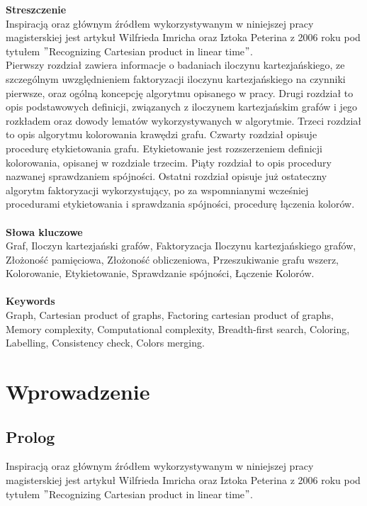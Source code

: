 \documentclass[12pt,a4paper,titlepage]{article}
\begin{document}
\textbf{Streszczenie}\\

Inspiracją oraz głównym źródłem wykorzystywanym w niniejszej pracy magisterskiej jest artykuł Wilfrieda Imricha oraz Iztoka Peterina z 2006 roku pod tytułem $"$Recognizing Cartesian product in linear time$"$. \\
Pierwszy rozdział zawiera informacje o badaniach iloczynu kartezjańskiego, ze szczególnym uwzględnieniem faktoryzacji iloczynu kartezjańskiego na czynniki pierwsze, oraz ogólną koncepcję algorytmu opisanego w pracy. Drugi rozdział to opis podstawowych definicji, związanych z iloczynem kartezjańskim grafów i jego rozkładem oraz dowody lematów wykorzystywanych w algorytmie. Trzeci rozdział to opis algorytmu kolorowania krawędzi grafu. Czwarty rozdział opisuje procedurę etykietowania grafu. Etykietowanie jest rozszerzeniem definicji kolorowania, opisanej w rozdziale trzecim. Piąty rozdział to opis procedury nazwanej sprawdzaniem spójności. Ostatni rozdział opisuje już ostateczny algorytm faktoryzacji wykorzystujący, po za wspomnianymi wcześniej procedurami etykietowania i sprawdzania spójności, procedurę łączenia kolorów. \\
\\
\textbf{Słowa kluczowe}\\

Graf, Iloczyn kartezjański grafów, Faktoryzacja Iloczynu kartezjańskiego grafów, Złożoność pamięciowa, Złożoność obliczeniowa, Przeszukiwanie grafu wszerz, Kolorowanie,
Etykietowanie, Sprawdzanie spójności, Łączenie Kolorów.\\
\\
\textbf{Keywords}\\

Graph, Cartesian product of graphs, Factoring cartesian product of graphs, Memory complexity, Computational complexity, Breadth-first search, Coloring,
Labelling, Consistency check, Colors merging.
\newpage
\tableofcontents
\newpage
\section{Wprowadzenie}
\subsection{Prolog}
Inspiracją oraz głównym źródłem wykorzystywanym w niniejszej pracy magisterskiej jest artykuł Wilfrieda Imricha oraz Iztoka Peterina z 2006 roku pod tytułem $"$Recognizing Cartesian product in linear time$"$. \\
\\
\end{document}
